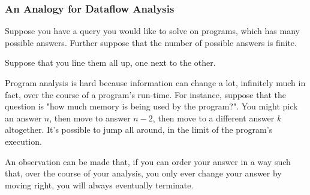 \documentclass[aspectratio=169, handout]{beamer}
\begin{document}
 \begin{frame}[fragile]
   \frametitle{An Analogy for Dataflow Analysis}

   Suppose you have a query you would like to solve on programs, which has many
   possible answers. Further suppose that the number of possible answers is finite.

   \pause
   \vspace{\fill}

   Suppose that you line them all up, one next to the other.

   \pause
   \vspace{\fill}

   \begin{center}
    \end{center}

   \pause
   \vspace{\fill}

   Program analysis is hard because information can change a lot, infinitely much
   in fact, over the course of a program's run-time. For instance, suppose that
   the question is "how much memory is being used by the program?". You might pick an answer $n$,
   then move to answer $n - 2$, then move to a different answer $k$ altogether. It's
   possible to jump all around, in the limit of the program's execution.

   \pause
   \vspace{\fill}

   An observation can be made that, if you can order your answer in a way such that,
   over the course of your analysis, you only ever change your answer by moving
   right, you will always eventually terminate.
 \end{frame}
\end{document}
